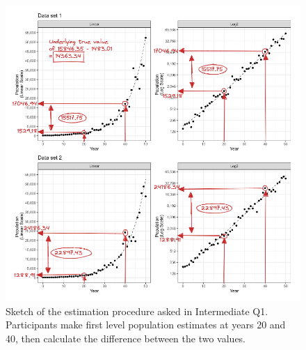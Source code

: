 \documentclass[print]{nuthesis}
\begin{document}
\begin{figure}[tbp]

{\centering \includegraphics[width=1\linewidth,]{images/03-estimation/qi1-sketch} 

}

\caption[Intermediate Q1 sketch]{Sketch of the estimation procedure asked in Intermediate Q1. Participants make first level population estimates at years 20 and 40, then calculate the difference between the two values.}\label{fig:qi1-sketch}
\end{figure}
\end{document}
